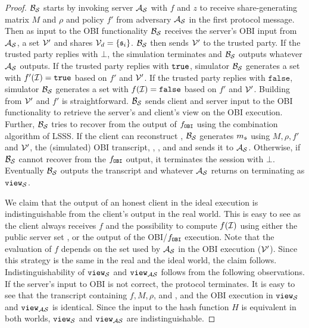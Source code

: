 \begin{proof}
$\mathcal{B}_\mathcal{S}$ starts by invoking server $\mathcal{A}_\mathcal{S}$ with $f$ and $z$ to receive share-generating matrix $M$ and $\rho$ and policy $f'$ from adversary $\mathcal{A}_\mathcal{S}$ in the first protocol message. 
Then as input to the \ac{OBI} functionality $\mathcal{B}_\mathcal{S}$ receives the server's \ac{OBI} input  from $\mathcal{A}_\mathcal{S}$, \ie a set $\mathcal{V}'$ and shares $\mathcal{V}_d=\{\mathfrak{s}_i\}$. 
$\mathcal{B}_\mathcal{S}$ then sends $\mathcal{V}'$ to the trusted party. 
If the trusted party replies with $\bot$, the simulation terminates and $\mathcal{B}_\mathcal{S}$ outputs whatever $\mathcal{A}_\mathcal{S}$ outputs. 
If the trusted party replies with $\mathtt{true}$, 
simulator $\mathcal{B}_\mathcal{S}$ generates a set \ClientSet with $f'(\mathcal{I})=\mathtt{true}$ based on $f'$ and $\mathcal{V}'$. 
If the trusted party replies with $\texttt{false}$, simulator $\mathcal{B}_\mathcal{S}$ generates a set \ClientSet with $f(\mathcal{I})=\texttt{false}$ based on $f'$ and $\mathcal{V}'$. 
Building \ClientSet from $\mathcal{V}'$ and $f'$ is straightforward. 
$\mathcal{B}_\mathcal{S}$ sends client and server input to the \ac{OBI} functionality to retrieve the server's and client's view on the \ac{OBI} execution. 
Further, $\mathcal{B}_\mathcal{S}$ tries to recover \secret from the output of $f_\mathtt{OBI}$ using the combination algorithm of \ac{LSSS}. 
If the client can reconstruct \secret, $\mathcal{B}_\mathcal{S}$ generates $m_\mathfrak{s}$ using $M, \rho, f'$ and $\mathcal{V}'$, the (simulated) \ac{OBI} transcript, \secret, \Client, and \Server and sends it to $\mathcal{A}_\mathcal{S}$. 
Otherwise, if $\mathcal{B}_\mathcal{S}$ cannot recover \secret from the $f_\mathtt{OBI}$ output, it terminates the session with $\bot$.
Eventually $\mathcal{B}_\mathcal{S}$ outputs the transcript and whatever $\mathcal{A}_\mathcal{S}$ returns on terminating as $\mathtt{view}_\mathcal{S}$.

We claim that the output of an honest client in the ideal execution is indistinguishable from the client's output in the real world.
This is easy to see as the client always receives $f$ and the possibility to compute $f(\mathcal{I})$ using either the public server set \ServerSet, or the output of the \ac{OBI}/$f_\mathtt{OBI}$ execution.
Note that the evaluation of $f$ depends on the set used by $\mathcal{A}_\mathcal{S}$ in the \ac{OBI} execution ($\mathcal{V}'$).
Since this strategy is the same in the real and the ideal world, the claim follows.
Indistinguishability of $\mathtt{view}_\mathcal{S}$ and $\mathtt{view}_{\mathcal{A}\mathcal{S}}$ follows from the following observations.
If the server's input to \ac{OBI} is not correct, the protocol terminates.
It is easy to see that the transcript containing $f, M, \rho$, and \ServerSet, and the \ac{OBI} execution in $\mathtt{view}_\mathcal{S}$ and $\mathtt{view}_{\mathcal{A}\mathcal{S}}$ is identical.
Since the input to the hash function $H$ is equivalent in both worlds, $\mathtt{view}_\mathcal{S}$ and $\mathtt{view}_{\mathcal{A}\mathcal{S}}$ are indistinguishable.

\end{proof}


